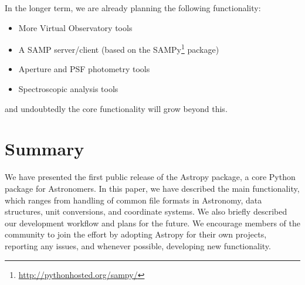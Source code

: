 \documentclass[traditabstract]{aa}
\begin{document}
In the longer term, we are already planning the following functionality:

\begin{itemize}
\item More Virtual Observatory tools
\item A SAMP server/client (based on the SAMPy\footnote{\url{http://pythonhosted.org/sampy/}} package)
\item Aperture and PSF photometry tools
\item Spectroscopic analysis tools
\end{itemize}

\noindent and undoubtedly the core functionality will grow beyond this.

\section{Summary}

\label{sec:summary}


We have presented the first public release of the Astropy package, a core Python package for Astronomers. In this paper, we have described the main functionality, which ranges from handling of common file formats in Astronomy, data structures, unit conversions, and coordinate systems. We also briefly described our development workflow and plans for the future. We encourage members of the community to join the effort by adopting Astropy for their own projects, reporting any issues, and whenever possible, developing new functionality.



\end{document}
